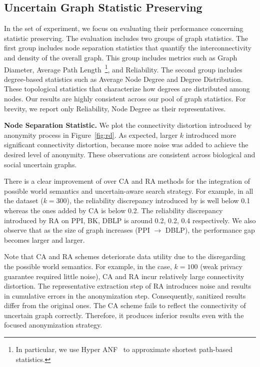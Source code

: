\subsection{Uncertain Graph Statistic Preserving}
In the set of experiment, we focus on evaluating their performance concerning statistic preserving. 
The evaluation includes two groups of graph statistics. 
The first group includes node separation statistics that quantify the interconnectivity and density of the overall graph.   
This group includes metrics such as Graph Diameter, Average  Path  Length~\footnote{In particular, we use Hyper ANF~\cite{Boldi_Rosa_Vigna_2011} to approximate shortest path-based statistics.}, and Reliability. 
The second group includes degree-based statistics such as Average  Node Degree and Degree Distribution.
These topological statistics that characterize how degrees are distributed among nodes. 
Our results are highly consistent across our pool of graph statistics.
For brevity, we report only Reliability, Node Degree as their representatives. 

\textbf{Node Separation Statistic.} 
We plot the connectivity distortion introduced by anonymity process in Figure~\ref{fig:rd}.  
As expected, larger $k$ introduced more significant connectivity distortion, because more noise was added to achieve the desired level of anonymity.   
These observations are consistent across biological and social uncertain graphs.

There is a clear improvement of {\methodName} over CA and RA methods for the integration of possible world semantics and uncertain-aware search strategy. 
For example, in all the dataset ($k=300$), the reliability discrepancy introduced by {\methodName} is well below 0.1 whereas the ones added by CA is below 0.2. The reliability discrepancy introduced by RA on PPI, BK, DBLP is around 0.2, 0.2, 0.4 respectively. We also observe that as the size of graph increases (PPI $\rightarrow$ DBLP), the performance gap becomes larger and larger.

Note that CA and RA schemes deteriorate data utility due to the disregarding the possible world semantics. 
For example, in the case, $k=100$ (weak privacy guarantee required little noise), CA and RA incur relatively large connectivity distortion. 
The representative extraction step of RA introduces noise and results in cumulative errors in the anonymization step. Consequently, sanitized results differ from the original ones. 
The CA scheme fails to reflect the connectivity of uncertain graph correctly. Therefore, it produces inferior results even with the focused anonymization strategy. 



